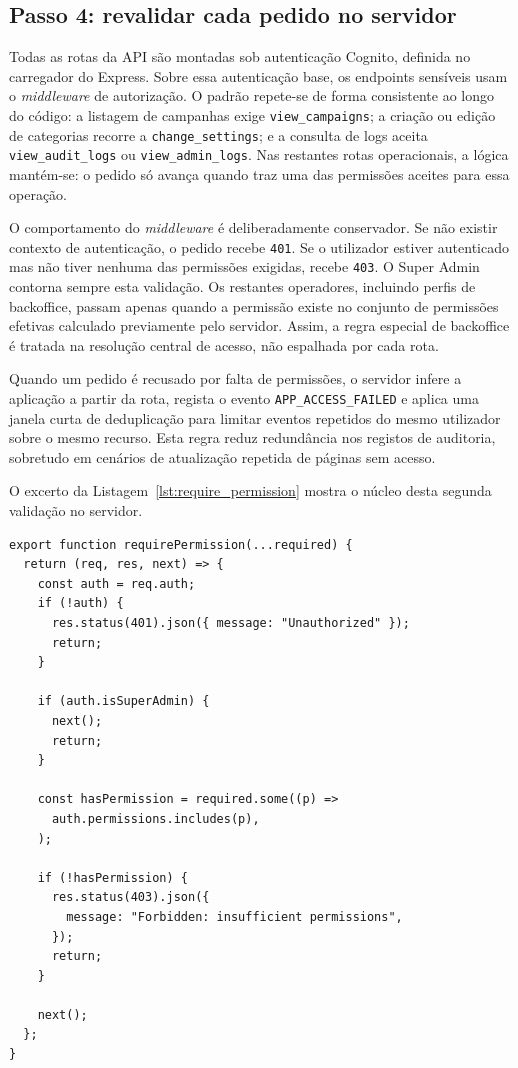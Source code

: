 \subsection{Passo 4: revalidar cada pedido no servidor}
\label{subsec:auth_step4}

Todas as rotas da \gls{API} são montadas sob autenticação Cognito, definida no carregador do Express. Sobre essa autenticação base, os endpoints sensíveis usam o \textit{middleware} de autorização. O padrão repete-se de forma consistente ao longo do código: a listagem de campanhas exige \texttt{view\_campaigns}; a criação ou edição de categorias recorre a \texttt{change\_settings}; e a consulta de logs aceita \texttt{view\_audit\_logs} ou \texttt{view\_admin\_logs}. Nas restantes rotas operacionais, a lógica mantém-se: o pedido só avança quando traz uma das permissões aceites para essa operação.

O comportamento do \textit{middleware} é deliberadamente conservador. Se não existir contexto de autenticação, o pedido recebe \texttt{401}. Se o utilizador estiver autenticado mas não tiver nenhuma das permissões exigidas, recebe \texttt{403}. O Super Admin contorna sempre esta validação. Os restantes operadores, incluindo perfis de backoffice, passam apenas quando a permissão existe no conjunto de permissões efetivas calculado previamente pelo servidor. Assim, a regra especial de backoffice é tratada na resolução central de acesso, não espalhada por cada rota.

Quando um pedido é recusado por falta de permissões, o servidor infere a aplicação a partir da rota, regista o evento \texttt{APP\_ACCESS\_FAILED} e aplica uma janela curta de deduplicação para limitar eventos repetidos do mesmo utilizador sobre o mesmo recurso. Esta regra reduz redundância nos registos de auditoria, sobretudo em cenários de atualização repetida de páginas sem acesso.

O excerto da Listagem~\ref{lst:require_permission} mostra o núcleo desta segunda validação no servidor.

\begin{lstlisting}[caption={Validação de permissões no middleware \texttt{requirePermission}}, label={lst:require_permission}]
export function requirePermission(...required) {
  return (req, res, next) => {
    const auth = req.auth;
    if (!auth) {
      res.status(401).json({ message: "Unauthorized" });
      return;
    }

    if (auth.isSuperAdmin) {
      next();
      return;
    }

    const hasPermission = required.some((p) =>
      auth.permissions.includes(p),
    );

    if (!hasPermission) {
      res.status(403).json({
        message: "Forbidden: insufficient permissions",
      });
      return;
    }

    next();
  };
}
\end{lstlisting}

